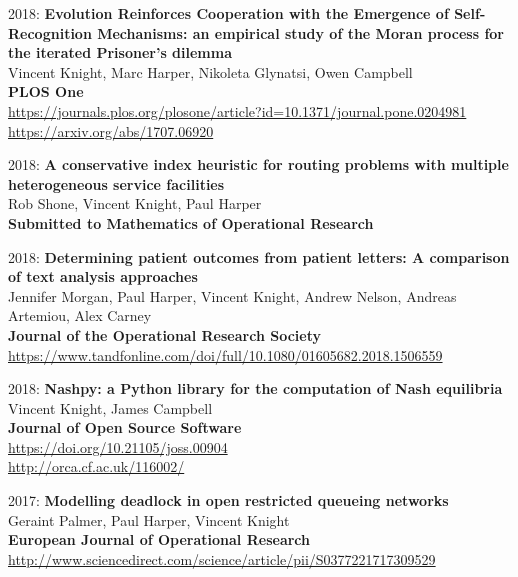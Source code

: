 \documentclass[10pt]{res} %
\begin{document}
\begin{resume}
\begin{etaremune}
\item
2018: \textbf{Evolution Reinforces Cooperation with the Emergence of Self-Recognition Mechanisms: an empirical study of the Moran process for the iterated Prisoner's dilemma }\\
Vincent Knight, Marc Harper, Nikoleta Glynatsi, Owen Campbell
\\
\textbf{PLOS One}
\\
\url{https://journals.plos.org/plosone/article?id=10.1371/journal.pone.0204981}
\\
\url{https://arxiv.org/abs/1707.06920}
\\

\item
2018: \textbf{A conservative index heuristic for routing problems with multiple heterogeneous service facilities}\\
Rob Shone, Vincent Knight, Paul Harper
\\
\textbf{Submitted to Mathematics of Operational Research}
\\

\item
2018: \textbf{Determining patient outcomes from patient letters: A comparison of text analysis approaches}\\
Jennifer Morgan, Paul Harper, Vincent Knight, Andrew Nelson, Andreas Artemiou, Alex Carney
\\
\textbf{Journal of the Operational Research Society}
\\
\url{https://www.tandfonline.com/doi/full/10.1080/01605682.2018.1506559}
\\

\item
2018: \textbf{Nashpy: a Python library for the computation of Nash equilibria}\\
Vincent Knight, James Campbell
\\
\textbf{Journal of Open Source Software}
\\
\url{https://doi.org/10.21105/joss.00904}
\\
\url{http://orca.cf.ac.uk/116002/}
\\

\item
2017: \textbf{Modelling deadlock in open restricted queueing networks}\\
Geraint Palmer, Paul Harper, Vincent Knight
\\
\textbf{European Journal of Operational Research}
\\
\url{http://www.sciencedirect.com/science/article/pii/S0377221717309529}
\\


\end{etaremune}
\end{resume}
\end{document}
